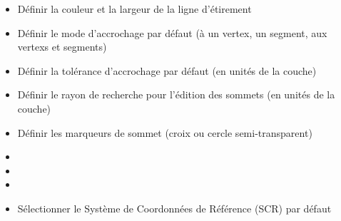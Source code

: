 %


\begin{itemize}
\item D\'efinir la couleur et la largeur de la ligne d'\'etirement
\item D\'efinir le mode d'accrochage par d\'efaut (\`a un vertex, un segment, aux vertexs et segments)
\item D\'efinir la tol\'erance d'accrochage par d\'efaut (en unit\'es de la couche) 
\item D\'efinir le rayon de recherche pour l'\'edition des sommets (en unit\'es de la couche) 
\item D\'efinir les marqueurs de sommet (croix ou cercle semi-transparent)
\end{itemize}

%


\begin{itemize}
\item {}
\item {}
\item {}
\item S\'electionner le Syst\`eme de Coordonn\'ees de R\'ef\'erence (SCR) par d\'efaut
\end{itemize}

